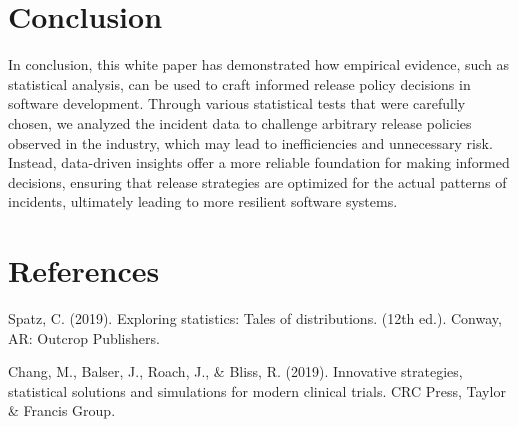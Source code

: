 \documentclass{article}
\begin{document}
\section{Conclusion}

In conclusion, this white paper has demonstrated how empirical evidence, such as statistical analysis, can be used to craft informed release policy decisions in software development. Through various statistical tests that were carefully chosen, we analyzed the incident data to challenge arbitrary release policies observed in the industry, which may lead to inefficiencies and unnecessary risk. Instead, data-driven insights offer a more reliable foundation for making informed decisions, ensuring that release strategies are optimized for the actual patterns of incidents, ultimately leading to more resilient software systems.

\newpage

\section{References}

Spatz, C. (2019). Exploring statistics: Tales of distributions. (12th ed.). Conway, AR: Outcrop Publishers. 

\vspace{5mm}

\noindent Chang, M., Balser, J., Roach, J., \& Bliss, R. (2019). Innovative strategies, statistical solutions and
simulations for modern clinical trials. CRC Press, Taylor \& Francis Group.
\end{document}
